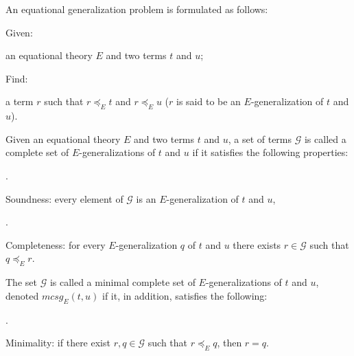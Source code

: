  
 
An equational generalization problem is formulated as follows:\par
  Given:  
 
an equational theory $E$ and two terms $t$ and $u$;\par
 
  Find:  
 
a term $r$ such that $r\preceq_{E}t$ and $r\preceq_{E}u$ ($r$ is said to be an $E$-generalization of $t$ and $u$).\par
 
   
 
 
Given an equational theory $E$ and two terms $t$ and $u$, a set of terms $\mathcal{G}$ is called a complete set of $E$-generalizations of $t$ and $u$ if it satisfies the following properties:\par
  
\par{}. 
 
Soundness: every element of $\mathcal{G}$ is an $E$-generalization of $t$ and $u$,\par
 
 
 
\par{}. 
 
Completeness: for every $E$-generalization $q$ of $t$ and $u$ there exists $r\in\mathcal{G}$ such that $q\preceq_{E}r$.\par
 
 
  
The set $\mathcal{G}$ is called a minimal complete set of $E$-generalizations of $t$ and $u$, denoted $\mathit{mcsg}_{E}(t,u)$ if it, in addition, satisfies the following:\par
  
\par{}. 
 
Minimality: if there exist $r,q\in\mathcal{G}$ such that $r\preceq_{E}q$, then $r=q$.\par
 
 
  
 
